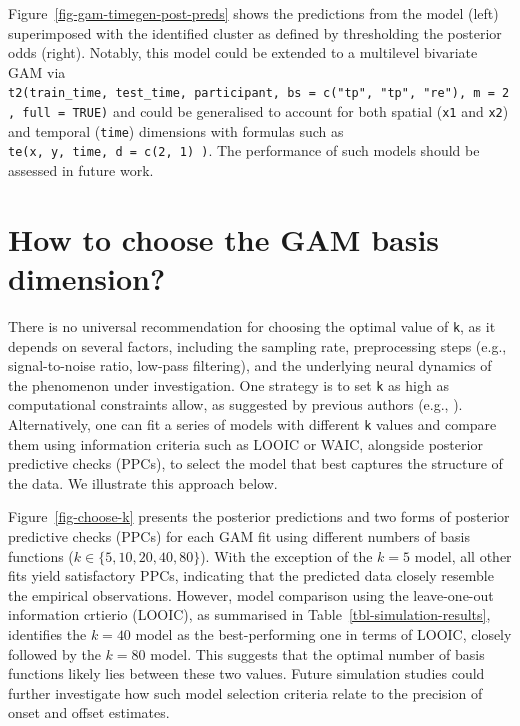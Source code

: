 \documentclass[
  doc,
  floatsintext,
  longtable,
  a4paper,
  nolmodern,
  notxfonts,
  notimes,
  colorlinks=true,linkcolor=blue,citecolor=blue,urlcolor=blue]{apa7}
\begin{document}
\setlength{\parindent}{0pt}
\setlength{\parskip}{6pt}

Figure~\ref{fig-gam-timegen-post-preds} shows the predictions from the
model (left) superimposed with the identified cluster as defined by
thresholding the posterior odds (right). Notably, this model could be
extended to a multilevel bivariate GAM via
\texttt{t2(train\_time,\ test\_time,\ participant,\ bs\ =\ c("tp",\ "tp",\ "re"),\ m\ =\ 2,\ full\ =\ TRUE)}
and could be generalised to account for both spatial (\texttt{x1} and
\texttt{x2}) and temporal (\texttt{time}) dimensions with formulas such
as \texttt{te(x,\ y,\ time,\ d\ =\ c(2,\ 1)\ )}. The performance of such
models should be assessed in future work.

\newpage

\section{How to choose the GAM basis dimension?}\label{apx-basis}

\setlength{\parindent}{0pt}
\setlength{\parskip}{6pt}

There is no universal recommendation for choosing the optimal value of
\texttt{k}, as it depends on several factors, including the sampling
rate, preprocessing steps (e.g., signal-to-noise ratio, low-pass
filtering), and the underlying neural dynamics of the phenomenon under
investigation. One strategy is to set \texttt{k} as high as
computational constraints allow, as suggested by previous authors (e.g.,
).
Alternatively, one can fit a series of models with different \texttt{k}
values and compare them using information criteria such as LOOIC or
WAIC, alongside posterior predictive checks (PPCs), to select the model
that best captures the structure of the data. We illustrate this
approach below.

\setlength{\parindent}{0pt}
\setlength{\parskip}{6pt}

Figure~\ref{fig-choose-k} presents the posterior predictions and two
forms of posterior predictive checks (PPCs) for each GAM fit using
different numbers of basis functions (\(k \in \{5, 10, 20, 40, 80\}\)).
With the exception of the \(k=5\) model, all other fits yield
satisfactory PPCs, indicating that the predicted data closely resemble
the empirical observations. However, model comparison using the
leave-one-out information crtierio (LOOIC), as summarised in
Table~\ref{tbl-simulation-results}, identifies the \(k=40\) model as the
best-performing one in terms of LOOIC, closely followed by the \(k=80\)
model. This suggests that the optimal number of basis functions likely
lies between these two values. Future simulation studies could further
investigate how such model selection criteria relate to the precision of
onset and offset estimates.
\end{document}
